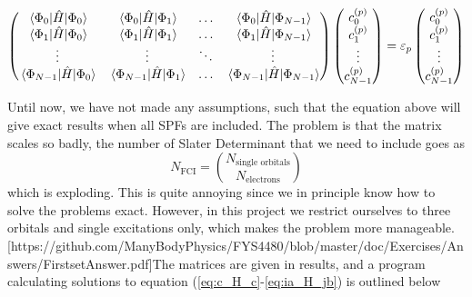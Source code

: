 \begin{equation*}
\begin{pmatrix}
\mel{\Phi_0}{\hat{H}}{\Phi_0} & \mel{\Phi_0}{\hat{H}}{\Phi_1} & \hdots & \mel{\Phi_0}{\hat{H}}{\Phi_{N-1}}\\
\mel{\Phi_1}{\hat{H}}{\Phi_0} & \mel{\Phi_1}{\hat{H}}{\Phi_1} & \hdots & \mel{\Phi_1}{\hat{H}}{\Phi_{N-1}}\\
\vdots & \vdots & \ddots & \vdots\\
\mel{\Phi_{N-1}}{\hat{H}}{\Phi_0} & \mel{\Phi_{N-1}}{\hat{H}}{\Phi_1} & \hdots & \mel{\Phi_{N-1}}{\hat{H}}{\Phi_{N-1}}\\
\end{pmatrix}
\begin{pmatrix}
c_0^{(p)}\\ c_1^{(p)} \\ \vdots\\ c_{N-1}^{(p)}
\end{pmatrix}
=\varepsilon_p
\begin{pmatrix}
c_0^{(p)}\\ c_1^{(p)} \\ \vdots\\ c_{N-1}^{(p)}
\end{pmatrix}
\end{equation*}

Until now, we have not made any assumptions, such that the equation above will give exact results when all SPFs are included. The problem is that the matrix scales so badly, the number of Slater Determinant that we need to include goes as 
\begin{equation}
N_{\text{FCI}}=\binom{N_{\text{single orbitals}}}{N_{\text{electrons}}}
\end{equation}
which is exploding. This is quite annoying since we in principle know how to solve the problems exact. However, in this project we restrict ourselves to three orbitals and single excitations only, which makes the problem more manageable. [https://github.com/ManyBodyPhysics/FYS4480/blob/master/doc/Exercises/Answers/FirstsetAnswer.pdf]The matrices are given in results, and a program calculating solutions to equation (\ref{eq:c_H_c}-\ref{eq:ia_H_jb}) is outlined below

